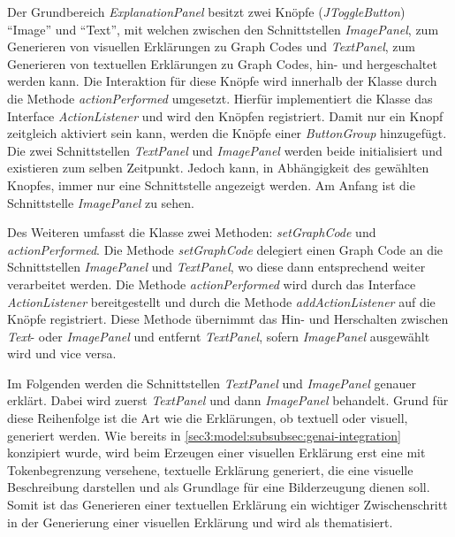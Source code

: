

Der Grundbereich \textit{ExplanationPanel} besitzt zwei Knöpfe (\textit{JToggleButton}) \enquote{Image} und \enquote{Text}, mit welchen zwischen den Schnittstellen \textit{ImagePanel}, zum Generieren von visuellen Erklärungen zu Graph Codes und \textit{TextPanel}, zum Generieren von textuellen Erklärungen zu Graph Codes, hin- und hergeschaltet werden kann.
Die Interaktion für diese Knöpfe wird innerhalb der Klasse durch die Methode \textit{actionPerformed} umgesetzt.
Hierfür implementiert die Klasse das Interface \textit{ActionListener} und wird den Knöpfen registriert.
Damit nur ein Knopf zeitgleich aktiviert sein kann, werden die Knöpfe einer \textit{ButtonGroup} hinzugefügt.
Die zwei Schnittstellen \textit{TextPanel} und \textit{ImagePanel} werden beide initialisiert und existieren zum selben Zeitpunkt.
Jedoch kann, in Abhängigkeit des gewählten Knopfes, immer nur eine Schnittstelle angezeigt werden.
Am Anfang ist die Schnittstelle \textit{ImagePanel} zu sehen.

Des Weiteren umfasst die Klasse zwei Methoden: \textit{setGraphCode} und \textit{actionPerformed}.
Die Methode \textit{setGraphCode} delegiert einen Graph Code an die Schnittstellen \textit{ImagePanel} und \textit{TextPanel}, wo diese dann entsprechend weiter verarbeitet werden.
Die Methode \textit{actionPerformed} wird durch das Interface \textit{ActionListener} bereitgestellt und durch die Methode \textit{addActionListener} auf die Knöpfe registriert.
Diese Methode übernimmt das Hin- und Herschalten zwischen \textit{Text}- oder \textit{ImagePanel} und entfernt \textit{TextPanel}, sofern \textit{ImagePanel} ausgewählt wird und vice versa.

Im Folgenden werden die Schnittstellen \textit{TextPanel} und \textit{ImagePanel} genauer erklärt.
Dabei wird zuerst \textit{TextPanel} und dann \textit{ImagePanel} behandelt.
Grund für diese Reihenfolge ist die Art wie die Erklärungen, ob textuell oder visuell, generiert werden.
Wie bereits in \cref{sec3:model:subsubsec:genai-integration} konzipiert wurde, wird beim Erzeugen einer visuellen Erklärung erst eine mit Tokenbegrenzung versehene, textuelle Erklärung generiert, die eine visuelle Beschreibung darstellen und als Grundlage für eine Bilderzeugung dienen soll.
Somit ist das Generieren einer textuellen Erklärung ein wichtiger Zwischenschritt in der Generierung einer visuellen Erklärung und wird als thematisiert.

